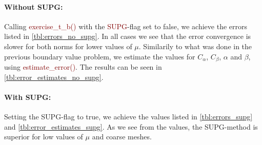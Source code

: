 \documentclass[]{article}
\renewcommand{\texttt}[1]{\textcolor{Maroon}{#1}}
\begin{document}
\paragraph{Without SUPG:} Calling \texttt{exercise\_t\_b()} with the
\texttt{SUPG}-flag set to false, we achieve the errors listed in
\cref{tbl:errors_no_supg}. In all cases we see that the error convergence is
slower for both norms for lower values of $\mu$.  Similarily to what was done
in the previous boundary value problem, we estimate the values for $C_\alpha$,
$C_\beta$, $\alpha$ and $\beta$, using \texttt{estimate\_error()}. The results
can be seen in \cref{tbl:error_estimates_no_supg}.

\paragraph{With SUPG:} Setting the SUPG-flag to true, we achieve the values
listed in \cref{tbl:errors_supg} and \cref{tbl:error_estimates_supg}. As we see
from the values, the SUPG-method is superior for low values of $\mu$ and
coarse meshes.
\end{document}
